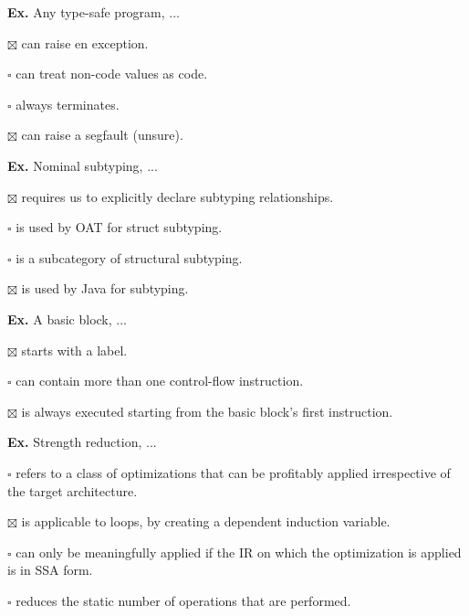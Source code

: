 \hrulefill

\textbf{Ex.} Any type-safe program, ...
\begin{compactitem}
	\item[$\boxtimes$] can raise en exception.
	\item[$\square$] can treat non-code values as code.
	\item[$\square$] always terminates.
	\item[$\boxtimes$] can raise a segfault (unsure).
\end{compactitem}

\hrulefill

\textbf{Ex.} Nominal subtyping, ...
\begin{compactitem}[$\quad\bullet$]
	\item[$\boxtimes$] requires us to explicitly declare subtyping relationships.
	\item[$\square$] is used by OAT for struct subtyping.
	\item[$\square$] is a subcategory of structural subtyping.
	\item[$\boxtimes$] is used by Java for subtyping.
\end{compactitem}

\hrulefill

\textbf{Ex.} A basic block, ...
\begin{compactitem}[$\quad\bullet$]
	\item[$\boxtimes$] starts with a label.
	\item[$\square$] can contain more than one control-flow instruction.
	\item[$\boxtimes$] is always executed starting from the basic block's first instruction.
\end{compactitem}

\hrulefill

\textbf{Ex.} Strength reduction, ...
\begin{compactitem}
	\item[$\square$] refers to a class of optimizations that can be profitably applied irrespective of the target architecture.
	\item[$\boxtimes$] is applicable to loops, by creating a dependent induction variable.
	\item[$\square$] can only be meaningfully applied if the IR on which the optimization is applied is in SSA form.
	\item[$\square$] reduces the static number of operations that are performed.
\end{compactitem}

